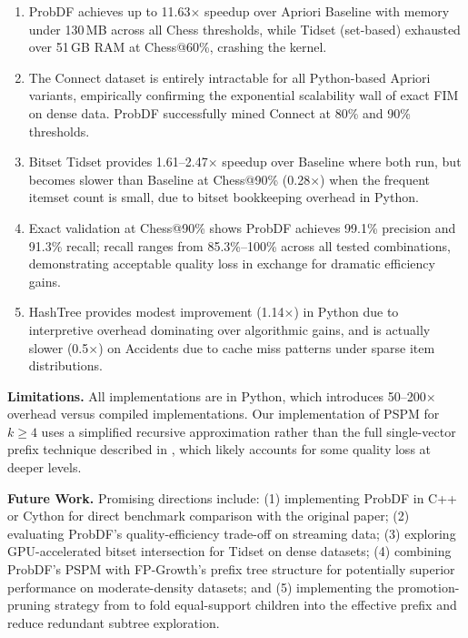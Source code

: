 \documentclass[conference]{IEEEtran}
\begin{document}
\begin{enumerate}
  \item ProbDF achieves up to 11.63$\times$ speedup over Apriori Baseline
    with memory under 130\,MB across all Chess thresholds, while
    Tidset (set-based) exhausted over 51\,GB RAM at Chess@60\%,
    crashing the kernel.
  \item The Connect dataset is entirely intractable for all Python-based
    Apriori variants, empirically confirming the exponential scalability
    wall of exact FIM on dense data. ProbDF successfully mined Connect
    at 80\% and 90\% thresholds.
  \item Bitset Tidset provides 1.61--2.47$\times$ speedup over Baseline
    where both run, but becomes slower than Baseline at Chess@90\%
    (0.28$\times$) when the frequent itemset count is small, due to
    bitset bookkeeping overhead in Python.
  \item Exact validation at Chess@90\% shows ProbDF achieves 99.1\%
    precision and 91.3\% recall; recall ranges from 85.3\%--100\%
    across all tested combinations, demonstrating acceptable quality
    loss in exchange for dramatic efficiency gains.
  \item HashTree provides modest improvement (1.14$\times$) in Python
    due to interpretive overhead dominating over algorithmic gains, and
    is actually slower (0.5$\times$) on Accidents due to cache miss
    patterns under sparse item distributions.
\end{enumerate}

\textbf{Limitations.}
All implementations are in Python, which introduces 50--200$\times$
overhead versus compiled implementations. Our implementation of PSPM
for $k \geq 4$ uses a simplified recursive approximation rather than the
full single-vector prefix technique described in \cite{probdf2024},
which likely accounts for some quality loss at deeper levels.

\textbf{Future Work.}
Promising directions include: (1) implementing ProbDF in C++ or Cython
for direct benchmark comparison with the original paper; (2) evaluating
ProbDF's quality-efficiency trade-off on streaming data; (3) exploring
GPU-accelerated bitset intersection for Tidset on dense datasets;
(4) combining ProbDF's PSPM with FP-Growth's prefix tree structure for
potentially superior performance on moderate-density datasets; and
(5) implementing the promotion-pruning strategy from \cite{probdf2024}
to fold equal-support children into the effective prefix and reduce
redundant subtree exploration.
\end{document}
